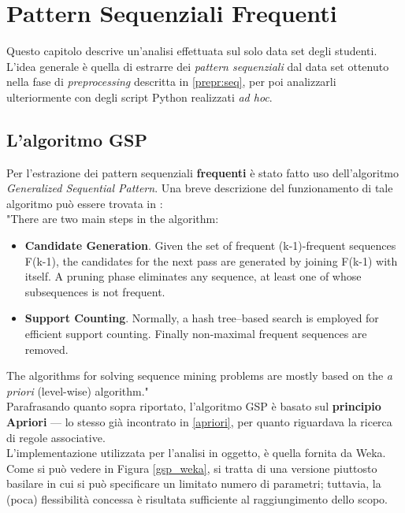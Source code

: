 \chapter{Pattern Sequenziali Frequenti}
\label{ch:seq}

Questo capitolo descrive un'analisi effettuata sul solo data set degli studenti. L'idea generale è quella di estrarre dei \textit{pattern sequenziali} dal data set ottenuto nella fase di \textit{preprocessing} descritta in \ref{prepr:seq}, per poi analizzarli ulteriormente con degli script Python realizzati \textit{ad hoc}.

\section{L'algoritmo GSP}

    Per l'estrazione dei pattern sequenziali \textbf{frequenti} è stato fatto uso dell'algoritmo \textit{Generalized Sequential Pattern}. Una breve descrizione del funzionamento di tale algoritmo può essere trovata in \cite{gsp}: \\

    "There are two main steps in the algorithm:
    \begin{itemize}
        \item \textbf{Candidate Generation}. Given the set of frequent (k-1)-frequent sequences F(k-1), the candidates for the next pass are generated by joining F(k-1) with itself. A pruning phase eliminates any sequence, at least one of whose subsequences is not frequent.
        \item \textbf{Support Counting}. Normally, a hash tree–based search is employed for efficient support counting. Finally non-maximal frequent sequences are removed.
    \end{itemize}

    The algorithms for solving sequence mining problems are mostly based on the \textit{a priori} (level-wise) algorithm." \\

    Parafrasando quanto sopra riportato, l'algoritmo GSP è basato sul \textbf{principio Apriori} --- lo stesso già incontrato in \ref{apriori}, per quanto riguardava la ricerca di regole associative. \\

    L'implementazione utilizzata per l'analisi in oggetto, è quella fornita da Weka. Come si può vedere in Figura \ref{gsp_weka}, si tratta di una versione piuttosto basilare in cui si può specificare un limitato numero di parametri; tuttavia, la (poca) flessibilità concessa è risultata sufficiente al raggiungimento dello scopo.

